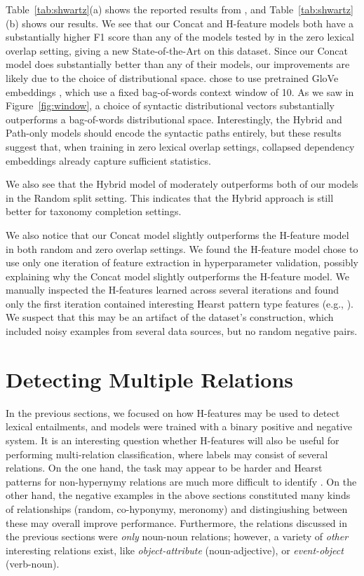 Table~\ref{tab:shwartz}(a) shows the reported results from
, and Table~\ref{tab:shwartz}(b) shows our results.
We see that our Concat and H-feature models both have a substantially higher F1
score than any of the models tested by  in the zero
lexical overlap setting, giving a new State-of-the-Art on this dataset. Since
our Concat model does substantially better than any of their models, our
improvements are likely due to the choice of distributional space.
 chose to use pretrained GloVe embeddings
\cite{pennington:2014:emnlp}, which use a fixed bag-of-words context window of
10.  As we saw in Figure~\ref{fig:window}, a choice of syntactic distributional
vectors substantially outperforms a bag-of-words distributional space.
Interestingly, the Hybrid and Path-only models should encode the syntactic
paths entirely, but these results suggest that, when training in zero lexical
overlap settings, collapsed dependency embeddings already capture sufficient
statistics. 

We also see that the Hybrid model of  moderately
outperforms both of our models in the Random split setting. This indicates that
the Hybrid approach is still better for taxonomy completion settings.

We also notice that our Concat model slightly outperforms the H-feature model
in both random and zero overlap settings. We found the H-feature model chose to
use only one iteration of feature extraction in hyperparameter validation,
possibly explaining why the Concat model slightly outperforms the H-feature
model. We manually inspected the H-features learned across several iterations
and found only the first iteration contained interesting Hearst pattern type
features (e.g., ). We suspect that this may be an artifact of the
dataset's construction, which included noisy examples from several data
sources, but no random negative pairs.

\section{Detecting Multiple Relations}

In the previous sections, we focused on how H-features may be used to detect
lexical entailments, and models were trained with a binary positive and
negative system. It is an interesting question whether H-features will also be useful
for performing multi-relation classification, where labels may consist of
several relations. On the one hand, the task may appear to be harder and Hearst
patterns for non-hypernymy relations are much more difficult to identify \cite{girju:2006:cl}.
On the other hand, the negative examples in the above sections constituted
many kinds of relationships (random, co-hyponymy, meronomy) and distingiushing
between these may overall improve performance. Furthermore, the relations
discussed in the previous sections were {\em only} noun-noun relations; however,
a variety of {\em other} interesting relations exist, like
{\em object-attribute} (noun-adjective), or {\em event-object} (verb-noun).


